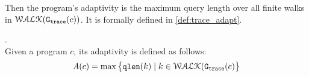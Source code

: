Then the program's adaptivity is the maximum query length over all finite walks in $\mathcal{WALK}(\mathtt{{G_{trace}}}({c}))$.
%
It is formally defined in \ref{def:trace_adapt}.
%
\begin{defn}
    .
    \label{def:trace_adapt}
    \\
    Given a program ${c}$, 
    its adaptivity is defined as follows:
    $$
    A(c) = \max \big 
    \{ \mathtt{qlen}(k) \mid k \in \mathcal{WALK}(\mathtt{{G_{trace}}}(c) \big \} 
    $$
    \end{defn}
%
% 